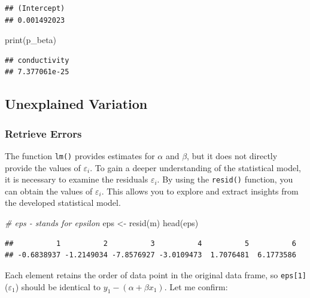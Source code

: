 \documentclass[
]{article}
\newenvironment{Shaded}{\begin{snugshade}}{\end{snugshade}}
\newcommand{\CommentTok}[1]{\textcolor[rgb]{0.56,0.35,0.01}{\textit{#1}}}
\newcommand{\FunctionTok}[1]{\textcolor[rgb]{0.00,0.00,0.00}{#1}}
\newcommand{\NormalTok}[1]{#1}
\newcommand{\OtherTok}[1]{\textcolor[rgb]{0.56,0.35,0.01}{#1}}
\begin{document}
\begin{verbatim}
## (Intercept) 
## 0.001492023
\end{verbatim}

\begin{Shaded}
\begin{Highlighting}[]
\FunctionTok{print}\NormalTok{(p\_beta)}
\end{Highlighting}
\end{Shaded}

\begin{verbatim}
## conductivity 
## 7.377061e-25
\end{verbatim}

\hypertarget{unexplained-variation}{%
\subsection{Unexplained Variation}\label{unexplained-variation}}

\hypertarget{retrieve-errors}{%
\subsubsection{Retrieve Errors}\label{retrieve-errors}}

The function \texttt{lm()} provides estimates for \(\alpha\) and \(\beta\), but it does not directly provide the values of \(\varepsilon_i\). To gain a deeper understanding of the statistical model, it is necessary to examine the residuals \(\varepsilon_i\). By using the \texttt{resid()} function, you can obtain the values of \(\varepsilon_i\). This allows you to explore and extract insights from the developed statistical model.

\begin{Shaded}
\begin{Highlighting}[]
\CommentTok{\# eps {-} stands for epsilon}
\NormalTok{eps }\OtherTok{\textless{}{-}} \FunctionTok{resid}\NormalTok{(m)}
\FunctionTok{head}\NormalTok{(eps)}
\end{Highlighting}
\end{Shaded}

\begin{verbatim}
##          1          2          3          4          5          6 
## -0.6838937 -1.2149034 -7.8576927 -3.0109473  1.7076481  6.1773586
\end{verbatim}

Each element retains the order of data point in the original data frame, so \texttt{eps{[}1{]}} (\(\varepsilon_1\)) should be identical to \(y_1 - (\alpha + \beta x_1)\). Let me confirm:
\end{document}

